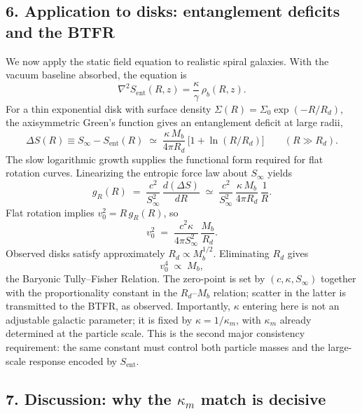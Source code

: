 \documentclass[11pt]{article}
\begin{document}
\subsection*{6. Application to disks: entanglement deficits and the BTFR}

We now apply the static field equation to realistic spiral galaxies. With the vacuum baseline absorbed, the equation is
\[
\nabla^2 S_{\mathrm{ent}}(R, z) = \frac{\kappa}{\gamma}\, \rho_b(R, z).
\]
For a thin exponential disk with surface density $\Sigma(R) = \Sigma_0 \exp(-R/R_d)$, the axisymmetric Green’s function gives an entanglement deficit at large radii,
\[
\Delta S(R) \equiv S_\infty - S_{\mathrm{ent}}(R) \;\simeq\; \frac{\kappa\, M_b}{4\pi R_d}\,\Big[ 1 + \ln(R/R_d) \Big] \qquad (R \gg R_d).
\]
The slow logarithmic growth supplies the functional form required for flat rotation curves. Linearizing the entropic force law about $S_\infty$ yields
\[
g_R(R) \;=\; \frac{c^2}{S_\infty^2}\, \frac{d(\Delta S)}{dR} \;\simeq\; \frac{c^2}{S_\infty^2}\, \frac{\kappa\, M_b}{4\pi R_d}\, \frac{1}{R}.
\]
Flat rotation implies $v_0^2 = R\, g_R(R)$, so
\[
v_0^2 \;=\; \frac{c^2 \kappa}{4\pi S_\infty^2}\, \frac{M_b}{R_d}.
\]
Observed disks satisfy approximately $R_d \propto M_b^{1/2}$. Eliminating $R_d$ gives
\[
v_0^4 \;\propto\; M_b,
\]
the Baryonic Tully–Fisher Relation. The zero-point is set by $(c, \kappa, S_\infty)$ together with the proportionality constant in the $R_d$–$M_b$ relation; scatter in the latter is transmitted to the BTFR, as observed. Importantly, $\kappa$ entering here is not an adjustable galactic parameter; it is fixed by $\kappa = 1/\kappa_m$, with $\kappa_m$ already determined at the particle scale. This is the second major consistency requirement: the same constant must control both particle masses and the large-scale response encoded by $S_{\mathrm{ent}}$.

\subsection*{7. Discussion: why the $\kappa_m$ match is decisive}
\end{document}
